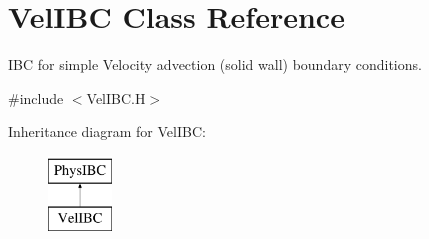 \hypertarget{class_vel_i_b_c}{}\section{Vel\+I\+BC Class Reference}
\label{class_vel_i_b_c}


I\+BC for simple Velocity advection (solid wall) boundary conditions.  




{\ttfamily \#include $<$Vel\+I\+B\+C.\+H$>$}

Inheritance diagram for Vel\+I\+BC\+:\begin{figure}[H]
\begin{center}
\leavevmode
\includegraphics[height=2.000000cm]{class_vel_i_b_c}
\end{center}
\end{figure}
